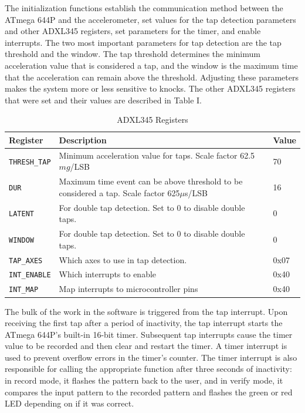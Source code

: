 \documentclass[conference]{./IEEEtran}
\begin{document}
The initialization functions establish the communication method between the ATmega 644P and the accelerometer, set values for the tap detection parameters and other ADXL345 registers, set parameters for the timer, and enable interrupts. The two most important parameters for tap detection are the tap threshold and the window. The tap threshold determines the minimum acceleration value that is considered a tap, and the window is the maximum time that the acceleration can remain above the threshold. Adjusting these parameters makes the system more or less sensitive to knocks. The other ADXL345 registers that were set and their values are described in Table I.

\begin{table}
\renewcommand{\arraystretch}{1.3}
\caption{ADXL345 Registers}
\label{table_regs}
\centering
\begin{tabular}{p{2cm}p{4cm}p{1cm}}
\hline
Register & Description & Value\\
\hline
\texttt{THRESH\_TAP} & Minimum acceleration value for taps. Scale factor 62.5$mg$/LSB& 70\\
\texttt{DUR} & Maximum time event can be above threshold to be considered a tap. Scale factor 625$\mu$s/LSB& 16\\
\texttt{LATENT} & For double tap detection. Set to 0 to disable double taps. & 0\\
\texttt{WINDOW} & For double tap detection. Set to 0 to disable double taps. & 0\\
\texttt{TAP\_AXES} & Which axes to use in tap detection. & 0x07\\
\texttt{INT\_ENABLE} & Which interrupts to enable & 0x40\\
\texttt{INT\_MAP} & Map interrupts to microcontroller pins & 0x40 \\
\hline
\end{tabular}
\end{table}


The bulk of the work in the software is triggered from the tap interrupt. Upon receiving the first tap after a period of inactivity, the tap interrupt starts the ATmega 644P's built-in 16-bit timer. Subsequent tap interrupts cause the timer value to be recorded and then clear and restart the timer. A timer interrupt is used to prevent overflow errors in the timer's counter. The timer interrupt is also responsible for calling the appropriate function after three seconds of inactivity: in record mode, it flashes the pattern back to the user, and in verify mode, it compares the input pattern to the recorded pattern and flashes the green or red LED depending on if it was correct.
\end{document}
